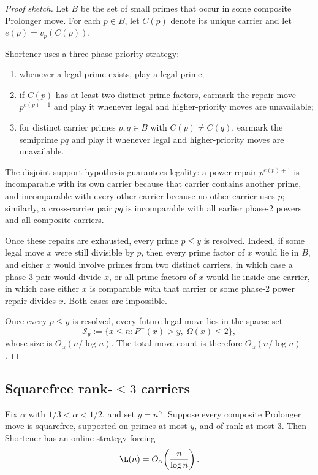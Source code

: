 \begin{proof}[Proof sketch]
Let $B$ be the set of small primes that occur in some composite Prolonger move.
For each $p\in B$, let $C(p)$ denote its unique carrier and let $e(p)=v_p(C(p))$.

Shortener uses a three-phase priority strategy:
\begin{enumerate}
  \item whenever a legal prime exists, play a legal prime;
  \item if $C(p)$ has at least two distinct prime factors, earmark the repair
    move $p^{e(p)+1}$ and play it whenever legal and higher-priority moves are
    unavailable;
  \item for distinct carrier primes $p,q\in B$ with $C(p)\neq C(q)$, earmark
    the semiprime $pq$ and play it whenever legal and higher-priority moves are
    unavailable.
\end{enumerate}

The disjoint-support hypothesis guarantees legality: a power repair
$p^{e(p)+1}$ is incomparable with its own carrier because that carrier contains
another prime, and incomparable with every other carrier because no other
carrier uses $p$; similarly, a cross-carrier pair $pq$ is incomparable with all
earlier phase-2 powers and all composite carriers.

Once these repairs are exhausted, every prime $p\le y$ is resolved.  Indeed, if
some legal move $x$ were still divisible by $p$, then every prime factor of $x$
would lie in $B$, and either $x$ would involve primes from two distinct
carriers, in which case a phase-3 pair would divide $x$, or all prime factors
of $x$ would lie inside one carrier, in which case either $x$ is comparable with
that carrier or some phase-2 power repair divides $x$.  Both cases are
impossible.

Once every $p\le y$ is resolved, every future legal move lies in the sparse set
\[
  \mathcal S_y := \{x\le n : P^-(x)>y,\ \Omega(x)\le 2\},
\]
whose size is $O_\alpha(n/\log n)$.  The total move count is therefore
$O_\alpha(n/\log n)$.
\end{proof}

\subsection{Squarefree rank-\texorpdfstring{$\le 3$}{<=3} carriers}

\begin{theorem}[Theorem 6]\label{thm:theorem6}
Fix $\alpha$ with $1/3<\alpha<1/2$, and set $y=n^\alpha$.  Suppose every
composite Prolonger move is squarefree, supported on primes at most $y$, and of
rank at most $3$.  Then Shortener has an online strategy forcing
\[
  \L(n)=O_\alpha\!\left(\frac{n}{\log n}\right).
\]
\end{theorem}

